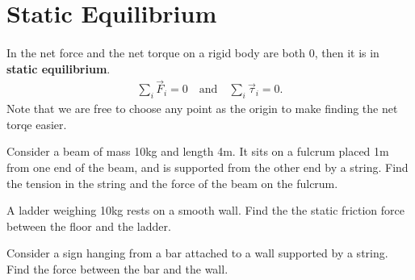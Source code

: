 \documentclass[../classical_mechanics.tex]{subfiles}
\begin{document}
    \section{Static Equilibrium}
        \paragraph{}
        In the net force and the net torque on a rigid body are both 0, then it is in \textbf{static equilibrium}.
        \begin{eqnarray}
            \sum_i\vec{F}_i=0\quad\text{and}\quad\sum_i\vec{\tau}_i=0.
        \end{eqnarray}
        Note that we are free to choose any point as the origin to make finding the net torqe easier.
        \begin{example}
            Consider a beam of mass 10kg and length 4m.
            It sits on a fulcrum placed 1m from one end of the beam, and is supported from the other end by a string.
            Find the tension in the string and the force of the beam on the fulcrum.
        \end{example}
        \begin{example}
            A ladder weighing 10kg rests on a smooth wall.
            Find the the static friction force between the floor and the ladder.
        \end{example}
        \begin{example}
            Consider a sign hanging from a bar attached to a wall supported by a string.
            Find the force between the bar and the wall.
        \end{example}
\end{document}
